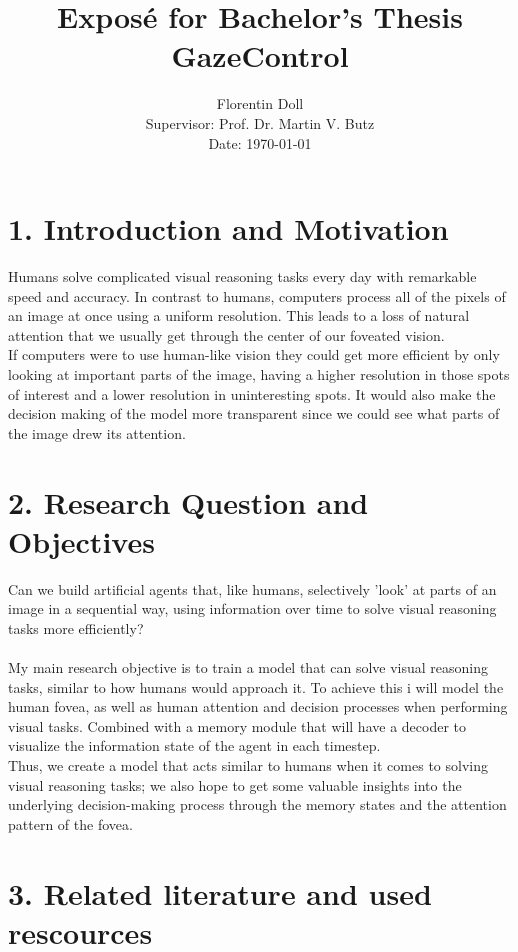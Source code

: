 \documentclass[12pt,a4paper]{article}
\title{Exposé for Bachelor's Thesis\\[1ex]
\large{GazeControl}}
\author{Florentin Doll\\
Supervisor: Prof. Dr. Martin V. Butz\\
Date: \today}
\date{}
\begin{document}
\maketitle

\section*{1. Introduction and Motivation}
Humans solve complicated visual reasoning tasks every day with remarkable speed and accuracy. In contrast to humans, computers process all of the pixels of an image at once using a uniform resolution. This leads to a loss of natural attention that we usually get through the center of our foveated vision. \\
If computers were to use human-like vision they could get more efficient by only looking at important parts of the image, having a higher resolution in those spots of interest and a lower resolution in uninteresting spots. It would also make the decision making of the model more transparent since we could see what parts of the image drew its attention.

\section*{2. Research Question and Objectives}
Can we build artificial agents that, like humans, selectively 'look' at parts of an image in a sequential way, using information over time to solve visual reasoning tasks more efficiently?\\\\
My main research objective is to train a model that can solve visual reasoning tasks, similar to how humans would approach it. To achieve this i will model the human fovea, as well as human attention and decision processes when performing visual tasks. Combined with a memory module that will have a decoder to visualize the information state of the agent in each timestep.\\
Thus, we create a model that acts similar to humans when it comes to solving visual reasoning tasks; we also hope to get some valuable insights into the underlying decision-making process through the memory states and the attention pattern of the fovea.

\section*{3. Related literature and used rescources}
\end{document}
